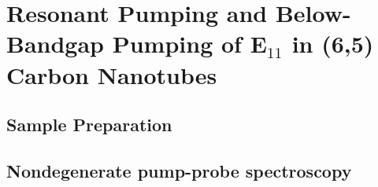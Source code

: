 \chapter{Resonant Pumping and Below-Bandgap Pumping of E$_{11}$ in (6,5) Carbon Nanotubes}
\label{ch:Sample_Methods}

\section{Sample Preparation}

\section{Nondegenerate pump-probe spectroscopy }

